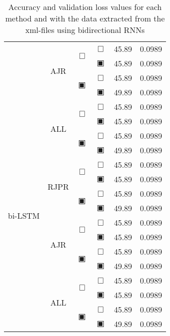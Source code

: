 \begin{table}[H]
\begin{tabular}{|c|c|c|c|c|c|}
				    & \multirow{4}{*}{ AJR } & \multirow{2}{*}{$\Box$} & $\Box$ & 45.89 & 0.0989\\\cline{4-6}
				    &                     &                         & $\blackinwhitesquare$ & 45.89 & 0.0989\\\cline{3-6}
				    &                     & \multirow{2}{*}{$\blackinwhitesquare$} & $\Box$ & 45.89 & 0.0989\\\cline{4-6}
				    &                     &                         & $\blackinwhitesquare$ & 49.89 & 0.0989\\\cline{2-6}
				    & \multirow{4}{*}{ ALL } & \multirow{2}{*}{$\Box$} & $\Box$ & 45.89 & 0.0989\\\cline{4-6}
				    &                     &                         & $\blackinwhitesquare$ & 45.89 & 0.0989\\\cline{3-6}
				    &                     & \multirow{2}{*}{$\blackinwhitesquare$} & $\Box$ & 45.89 & 0.0989\\\cline{4-6}
				    &                     &                         & $\blackinwhitesquare$ & 49.89 & 0.0989\\\cline{2-6}
		\hline\hline
		\multirow{8}{*}{bi-LSTM}& \multirow{4}{*}{ RJPR } & \multirow{2}{*}{$\Box$} & $\Box$ & 45.89 & 0.0989\\\cline{4-6}
				    &                    &                         & $\blackinwhitesquare$ & 45.89 & 0.0989\\\cline{3-6}
				    &                    & \multirow{2}{*}{$\blackinwhitesquare$} & $\Box$ & 45.89 & 0.0989\\\cline{4-6}
				    &                    &                         & $\blackinwhitesquare$ & 49.89 & 0.0989\\\cline{2-6}
				    & \multirow{4}{*}{ AJR } & \multirow{2}{*}{$\Box$} & $\Box$ & 45.89 & 0.0989\\\cline{4-6}
				    &                     &                         & $\blackinwhitesquare$ & 45.89 & 0.0989\\\cline{3-6}
				    &                     & \multirow{2}{*}{$\blackinwhitesquare$} & $\Box$ & 45.89 & 0.0989\\\cline{4-6}
				    &                     &                         & $\blackinwhitesquare$ & 49.89 & 0.0989\\\cline{2-6}
				    & \multirow{4}{*}{ ALL } & \multirow{2}{*}{$\Box$} & $\Box$ & 45.89 & 0.0989\\\cline{4-6}
				    &                     &                         & $\blackinwhitesquare$ & 45.89 & 0.0989\\\cline{3-6}
				    &                     & \multirow{2}{*}{$\blackinwhitesquare$} & $\Box$ & 45.89 & 0.0989\\\cline{4-6}
				    &                     &                         & $\blackinwhitesquare$ & 49.89 & 0.0989\\\cline{2-6}
		\hline\hline
	\end{tabular}
	\caption{Accuracy and validation loss values for each method and with the data extracted from the xml-files using bidirectional RNNs}
	\label{tab:results-experiments-rnn-bi}
\end{table}
